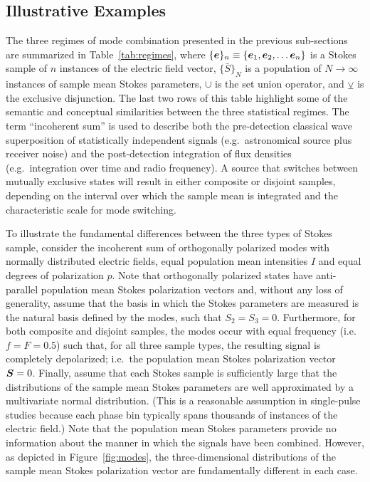 \documentclass[twocolumn]{aastex6}
\newcommand{\mbf}[1]{\mbox{\boldmath $#1$}}
\newcommand{\Fig}[1]{Figure~\ref{fig:#1}}
\newcommand{\Tab}[1]{Table~\ref{tab:#1}}
\begin{document}

\subsection{Illustrative Examples}
\label{sec:example}


The three regimes of mode combination presented in the previous
sub-sections are summarized in \Tab{regimes}, where
$\{\mbf{e}\}_n\equiv\{\mbf{e}_1,\mbf{e}_2,\ldots\mbf{e}_n\}$ is a
Stokes sample of $n$ instances of the electric field vector,
$\{\bar{S}\}_N$ is a population of $N\to\infty$ instances of sample
mean Stokes parameters, $\cup$ is the set union operator, and
$\veebar$ is the exclusive disjunction.
%
The last two rows of this table highlight some of the semantic and
conceptual similarities between the three statistical regimes.
%
The term ``incoherent sum'' is used to describe both the
pre-detection classical wave superposition of statistically
independent signals (e.g.\ astronomical source plus receiver noise)
and the post-detection integration of flux densities
(e.g.\ integration over time and radio frequency).
%
A source that switches between mutually exclusive states will result
in either composite or disjoint samples, depending on the interval
over which the sample mean is integrated and the characteristic scale
for mode switching.

To illustrate the fundamental differences between the three types of
Stokes sample, consider the incoherent sum of orthogonally polarized
modes with normally distributed electric fields, equal population mean
intensities $I$ and equal degrees of polarization $p$.
%
Note that orthogonally polarized states have anti-parallel population
mean Stokes polarization vectors and, without any loss of generality,
assume that the basis in which the Stokes parameters are measured is
the natural basis defined by the modes, such that $S_2 = S_3 = 0$.
%
Furthermore, for both composite and disjoint samples, the modes occur
with equal frequency (i.e. $f=F=0.5$) such that, for all three
sample types, the resulting signal is completely depolarized;
i.e.\ the
population mean Stokes polarization vector $\mbf{S}=0$.
%
Finally, assume that each Stokes sample is sufficiently large that
the distributions of the sample mean Stokes parameters are well
approximated by a multivariate normal distribution.
%
(This is a reasonable assumption in single-pulse studies because each
phase bin typically spans thousands of instances of the electric
field.)
%
Note that the population mean Stokes parameters provide no
information about the manner in which the signals have been combined.
%
However, as depicted in \Fig{modes}, the three-dimensional
distributions of the sample mean Stokes polarization vector are
fundamentally different in each case.
\end{document}
